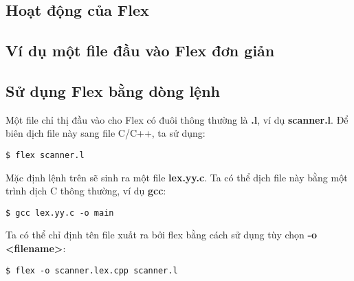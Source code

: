 \documentclass[../report.tex]{subfiles}
\begin{document}
\subsection{Hoạt động của Flex}

\subsection{Ví dụ một file đầu vào Flex đơn giản} 

\subsection{Sử dụng Flex bằng dòng lệnh} 
Một file chỉ thị đầu vào cho Flex có đuôi thông thường là \textbf{.l}, ví dụ \textbf{scanner.l}. 
Để biên dịch file này sang file C/C++, ta sử dụng:
\begin{verbatim}
$ flex scanner.l
\end{verbatim}
Mặc định lệnh trên sẽ sinh ra một file \textbf{lex.yy.c}.
Ta có thể dịch file này bằng một trình dịch C thông thường, ví dụ \textbf{gcc}:
\begin{verbatim}
$ gcc lex.yy.c -o main
\end{verbatim}
Ta có thể chỉ định tên file xuất ra bởi flex bằng cách sử dụng tùy chọn \textbf{-o <filename>}:
\begin{verbatim}
$ flex -o scanner.lex.cpp scanner.l
\end{verbatim}
\end{document}
